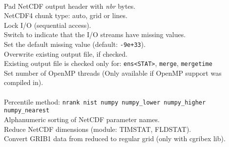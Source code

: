 \begin{tabbing}
         \> \\
\makebox[1.5in][l]{\hspace*{1cm}}
         \> Pad NetCDF output header with {\it nbr} bytes. \\
         \> NetCDF4 chunk type: auto, grid or lines. \\
         \> Lock I/O (sequential access). \\
         \> Switch to indicate that the I/O streams have missing values. \\
         \> Set the default missing value (default: {\tt-9e+33}). \\
         \> Overwrite existing output file, if checked. \\
         \> Existing output file is checked only for: {\tt ens<STAT>}, {\tt merge}, {\tt mergetime} \\
         \> Set number of OpenMP threads (Only available if OpenMP support was compiled in). \\
         \> \\
\makebox[1.5in][l]{\hspace*{1cm}}
         \> Percentile method: {\tt nrank nist numpy numpy\_lower numpy\_higher numpy\_nearest} \\
         \> Alphanumeric sorting of NetCDF parameter names. \\
         \> Reduce NetCDF dimensions (module: TIMSTAT, FLDSTAT). \\
         \> Convert GRIB1 data from reduced to regular grid (only with cgribex lib). \\

\end{tabbing}
